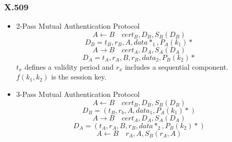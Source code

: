 \subsubsection{X.509}
\begin{itemize}
    \item 2-Pass Mutual Authentication Protocol
    $$ A \leftarrow B \quad cert_B,D_B,S_B(D_B) $$
    $$ D_B = t_B,r_B,A,data*_1,P_A(k_1)* $$
    $$ A \rightarrow B \quad cert_A,D_A,S_A(D_A) $$
    $$ D_A = t_A,r_A,B,r_B,data_2,P_B(k_2)* $$
    $t_x$ defines a validity period and $r_x$ includes a sequential component.
    $f(k_1,k_2)$ is the session key.
    \item 3-Pass Mutual Authentication Protocol
    $$ A \leftarrow B \quad cert_B,D_B,S_B(D_B) $$
    $$ D_B = (t_B,r_b,A,data_1,P_A(k_1)*) $$
    $$ A \rightarrow B \quad cert_A,D_A,S_A(D_A) $$
    $$ D_A = (t_A,r_A,B,r_B,data*_2,P_B(k_2)*) $$
    $$ A \leftarrow B \quad r_A,A,S_B(r_A,A) $$
\end{itemize}


